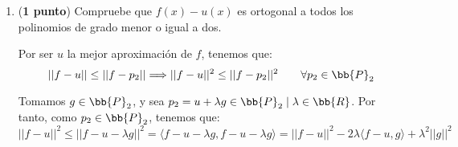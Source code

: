 \documentclass[12pt]{article}
\begin{document}
\begin{ejercicio} 
\begin{enumerate}
        Sea $\mathbb{P}_2=\mathcal{L}\left\{1,x,x^2-\frac{14}{9}\right\}$, y consideramos $u(x)=a_1 + a_2x + a_3\left(x^2-\frac{14}{9}\right)$.

        Calculamos productos escalares necesarios, sabiendo que se trata de una base ortogonal:
        \begin{equation*}
            \langle 1,1\rangle = 3 \qquad
            \langle x,x\rangle = \frac{14}{3}
        \end{equation*}
        \begin{equation*}
            \langle f,1\rangle = 0 \qquad
            \langle f,x\rangle = \frac{62}{5} \qquad
            \left\langle f, x^2-\frac{14}{9}\right\rangle = 0
        \end{equation*}

        Por trabajar con una base ortogonal, tenemos que:
        \begin{equation*}
            a_i = \frac{\langle e_i, f\rangle}{\langle e_i, e_i \rangle}
        \end{equation*}

        Por tanto, $a_1=a_3 = 0$. Además,
        \begin{equation*}
            a_2 = \frac{\langle x, f\rangle}{\langle x,x \rangle} = \frac{\frac{62}{5}}{\frac{14}{3}} = \frac{93}{35}
        \end{equation*}
        
        Es decir, la mejor aproximación en $\bb{P}_2$ es $$u(x)=\frac{93}{35}x$$
        
        \item (\textbf{1 punto})  Compruebe que $f(x) - u(x)$ es ortogonal a todos los polinomios de grado menor o igual a dos.

        Por ser $u$ la mejor aproximación de $f$, tenemos que:
        \begin{equation*}
            ||f-u||\leq ||f-p_2|| \Longrightarrow ||f-u||^2\leq ||f-p_2||^2 \qquad \forall p_2\in \bb{P}_2
        \end{equation*}

        Tomamos $g\in \bb{P}_2$, y sea $p_2=u+\lambda g \in \bb{P}_2 \mid \lambda \in \bb{R}$. Por tanto, como $p_2 \in \bb{P}_2$, tenemos que:
        \begin{equation*}
            ||f-u||^2\leq ||f-u-\lambda g||^2 = \langle f-u-\lambda g, f-u-\lambda g\rangle = ||f-u||^2 -2\lambda \langle f-u,g\rangle +\lambda^2 ||g||^2
        \end{equation*}


\end{enumerate}
\end{ejercicio}
\end{document}
